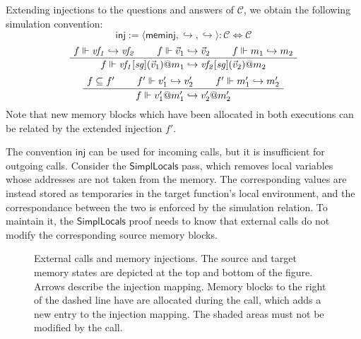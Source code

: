 \documentclass[sigplan,10pt,review,anonymous]{acmart}
\newcommand{\kw}[1]{\ensuremath{ \mathsf{#1} }}
\begin{document}
Extending injections to the questions and answers of $\mathcal{C}$,
we obtain the following simulation convention:
\[
    \kw{inj} := \langle
      \kw{meminj},
      {\hookrightarrow},
      {\hookrightarrow}
    \rangle : \mathcal{C} \Leftrightarrow \mathcal{C}
\]
\[
    \AxiomC{$f \Vdash \mathit{vf_1} \hookrightarrow \mathit{vf_2}$}
    \AxiomC{$f \Vdash \vec{v}_1 \hookrightarrow \vec{v}_2$}
    \AxiomC{$f \Vdash m_1 \hookrightarrow m_2$}
    \TrinaryInfC{$f \Vdash
      \mathit{vf_1}[\mathit{sg}](\vec{v}_1)@m_1
      \hookrightarrow
      \mathit{vf_2}[\mathit{sg}](\vec{v}_2)@m_2$}
    \DisplayProof
\]
\[
    \AxiomC{$f \subseteq f'$}
    \AxiomC{$f' \Vdash v_1' \hookrightarrow v_2'$}
    \AxiomC{$f' \Vdash m_1' \hookrightarrow m_2'$}
    \TrinaryInfC{$f \Vdash v_1'@m_1' \hookrightarrow v_2'@m_2'$}
    \DisplayProof
\]
Note that new memory blocks
which have been allocated in both executions
can be related by the extended injection $f'$.

The convention \kw{inj} can be used for incoming calls,
but it is insufficient for outgoing calls.
Consider the \kw{SimplLocals} pass,
which removes local variables whose addresses are not taken
from the memory.
The corresponding values are instead stored
as temporaries in the target function's local environment,
and the correspondance between the two
is enforced by the simulation relation.
To maintain it,
the \kw{SimplLocals} proof needs to know that
external calls do not modify
the corresponding source memory blocks.

\begin{figure} %
  \caption{External calls and memory injections.
    The source and target memory states are
    depicted at the top and bottom
    of the figure. Arrows describe the injection mapping.
    Memory blocks to the right of the dashed line
    have are allocated during the call,
    which adds a new entry to the injection mapping.
    The shaded areas must not be modified by the call.
  }
  \label{fig:injp}
\end{figure}
\end{document}
